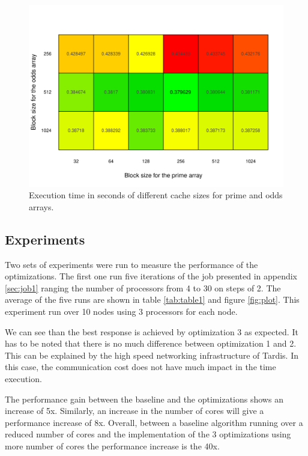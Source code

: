 \documentclass[10pt]{scrartcl}
\begin{document}
\begin{figure}
  \centering
  \includegraphics[width=\textwidth]{cache}
  \caption{Execution time in seconds of different cache sizes for prime and odds arrays.}\label{fig:cache}
\end{figure}

\subsection{Experiments}
Two sets of experiments were run to measure the performance of the optimizations.  The first one run five iterations of the job presented in appendix \ref{sec:job1} ranging the number of processors from 4 to 30 on steps of 2.  The average of the five runs are shown in table \ref{tab:table1} and figure \ref{fig:plot}.  This experiment run over 10 nodes using 3 processors for each node.

We can see than the best response is achieved by optimization 3 as expected.  It has to be noted that there is no much difference between optimization 1 and 2.  This can be explained by the high speed networking infrastructure of Tardis.  In this case, the communication cost does not have much impact in the time execution.

The performance gain between the baseline and the optimizations shows an increase of 5x.  Similarly, an increase in the number of cores will give a performance increase of 8x.  Overall, between a baseline algorithm running over a reduced number of cores and the implementation of the 3 optimizations using more number of cores the performance increase is the 40x.
\end{document}

